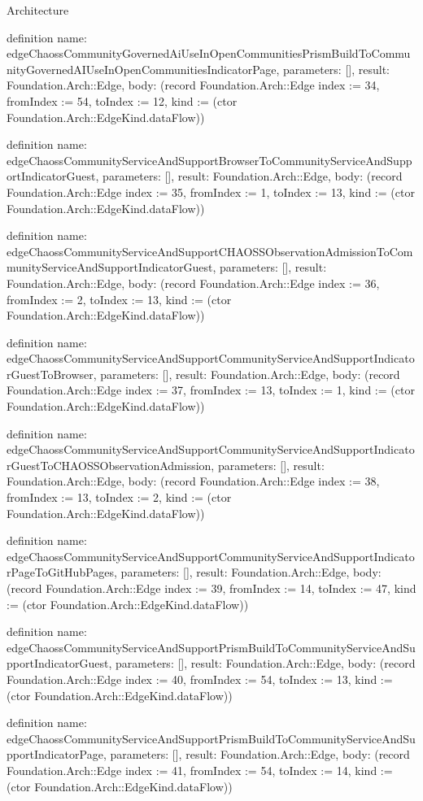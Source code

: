 \begin{lexlean}{Architecture}
\begin{semanticmodule}
definition{
  name: edgeChaossCommunityGovernedAiUseInOpenCommunitiesPrismBuildToCommunityGovernedAIUseInOpenCommunitiesIndicatorPage,
  parameters: [],
  result: Foundation.Arch::Edge,
  body: (record Foundation.Arch::Edge {index := 34, fromIndex := 54, toIndex := 12, kind := (ctor Foundation.Arch::EdgeKind.dataFlow)})
}

definition{
  name: edgeChaossCommunityServiceAndSupportBrowserToCommunityServiceAndSupportIndicatorGuest,
  parameters: [],
  result: Foundation.Arch::Edge,
  body: (record Foundation.Arch::Edge {index := 35, fromIndex := 1, toIndex := 13, kind := (ctor Foundation.Arch::EdgeKind.dataFlow)})
}

definition{
  name: edgeChaossCommunityServiceAndSupportCHAOSSObservationAdmissionToCommunityServiceAndSupportIndicatorGuest,
  parameters: [],
  result: Foundation.Arch::Edge,
  body: (record Foundation.Arch::Edge {index := 36, fromIndex := 2, toIndex := 13, kind := (ctor Foundation.Arch::EdgeKind.dataFlow)})
}

definition{
  name: edgeChaossCommunityServiceAndSupportCommunityServiceAndSupportIndicatorGuestToBrowser,
  parameters: [],
  result: Foundation.Arch::Edge,
  body: (record Foundation.Arch::Edge {index := 37, fromIndex := 13, toIndex := 1, kind := (ctor Foundation.Arch::EdgeKind.dataFlow)})
}

definition{
  name: edgeChaossCommunityServiceAndSupportCommunityServiceAndSupportIndicatorGuestToCHAOSSObservationAdmission,
  parameters: [],
  result: Foundation.Arch::Edge,
  body: (record Foundation.Arch::Edge {index := 38, fromIndex := 13, toIndex := 2, kind := (ctor Foundation.Arch::EdgeKind.dataFlow)})
}

definition{
  name: edgeChaossCommunityServiceAndSupportCommunityServiceAndSupportIndicatorPageToGitHubPages,
  parameters: [],
  result: Foundation.Arch::Edge,
  body: (record Foundation.Arch::Edge {index := 39, fromIndex := 14, toIndex := 47, kind := (ctor Foundation.Arch::EdgeKind.dataFlow)})
}

definition{
  name: edgeChaossCommunityServiceAndSupportPrismBuildToCommunityServiceAndSupportIndicatorGuest,
  parameters: [],
  result: Foundation.Arch::Edge,
  body: (record Foundation.Arch::Edge {index := 40, fromIndex := 54, toIndex := 13, kind := (ctor Foundation.Arch::EdgeKind.dataFlow)})
}

definition{
  name: edgeChaossCommunityServiceAndSupportPrismBuildToCommunityServiceAndSupportIndicatorPage,
  parameters: [],
  result: Foundation.Arch::Edge,
  body: (record Foundation.Arch::Edge {index := 41, fromIndex := 54, toIndex := 14, kind := (ctor Foundation.Arch::EdgeKind.dataFlow)})
}


\end{semanticmodule}
\end{lexlean}
